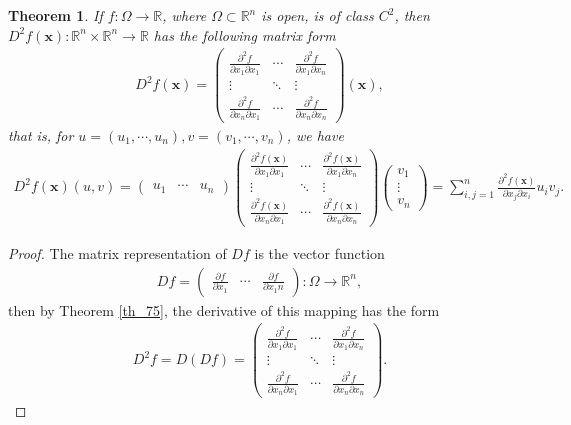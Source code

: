 \documentclass[11pt]{book}
\newtheorem{theorem}{Theorem}[chapter]
\theoremstyle{definition}
\numberwithin{equation}{chapter}
\begin{document}
\begin{theorem}\label{th_719}
If $f: \Omega \to \mathbb{R}$, where $\Omega \subset \mathbb{R}^n$ is open, is of class $C^2$, then $D^2f(\mathbf{x}): \mathbb{R}^n \times \mathbb{R}^n \to \mathbb{R}$ has the following matrix form
\begin{align*}
    D^2f(\mathbf{x}) = \begin{pmatrix}
        \frac{\partial^2 f}{\partial x_1 \partial x_1} & \cdots & \frac{\partial^2 f}{\partial x_1 \partial x_n} \\
        \vdots & \ddots & \vdots \\
        \frac{\partial^2 f}{\partial x_n \partial x_1} & \cdots & \frac{\partial^2 f}{\partial x_n \partial x_n}
    \end{pmatrix}(\mathbf{x}),
\end{align*}
that is, for $u = (u_1, \cdots, u_n),  v = (v_1, \cdots, v_n)$, we have
\begin{align*}
    D^2f(\mathbf{x})(u,v) = \begin{pmatrix}
        u_1 & \cdots & u_n    
    \end{pmatrix} 
    \begin{pmatrix}
        \frac{\partial^2 f(\mathbf{x})}{\partial x_1 \partial x_1} & \cdots & \frac{\partial^2 f(\mathbf{x})}{\partial x_1 \partial x_n} \\
        \vdots & \ddots & \vdots \\
        \frac{\partial^2 f(\mathbf{x})}{\partial x_n \partial x_1} & \cdots & \frac{\partial^2 f(\mathbf{x})}{\partial x_n \partial x_n}
    \end{pmatrix} 
    \begin{pmatrix}
        v_1 \\
        \vdots \\
        v_n
    \end{pmatrix} = \sum^n_{i,j=1} \frac{\partial^2 f(\mathbf{x})}{\partial x_j \partial x_i} u_i v_j.
\end{align*}
\end{theorem}
\begin{proof}
The matrix representation of $Df$ is the vector function
\begin{align*}
    Df = \begin{pmatrix}
        \frac{\partial f}{\partial x_1} & \cdots & \frac{\partial f}{\partial x_1n}
    \end{pmatrix}: \Omega \to \mathbb{R}^n,
\end{align*}
then by Theorem \ref{th_75}, the derivative of this mapping has the form
\begin{align}\label{th_719_equ1}
    D^2f = D(Df) = \begin{pmatrix}
        \frac{\partial^2 f}{\partial x_1 \partial x_1} & \cdots & \frac{\partial^2 f}{\partial x_1 \partial x_n} \\
        \vdots & \ddots & \vdots \\
        \frac{\partial^2 f}{\partial x_n \partial x_1} & \cdots & \frac{\partial^2 f}{\partial x_n \partial x_n}
    \end{pmatrix}.
\end{align}
\end{proof}
\end{document}
